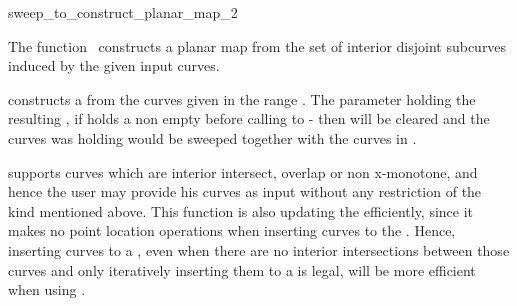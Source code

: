 

\begin{ccRefFunction}{sweep_to_construct_planar_map_2}  %


\ccDefinition
  
The function \ccRefName\ constructs a planar map from the set of 
interior disjoint subcurves induced by the given input curves.



\def\ccLongParamLayout{\ccTrue} 


constructs a  from the curves given in the range
\ccStyle{[curves_begin, curves_end)}. The parameter 
holding the resulting , if  holds a
non empty  before calling to
 - then  will be
cleared and the curves  was holding would be sweeped
together with the curves in \ccStyle{[curves_begin, curves_end)}.

 supports curves which are
interior intersect, overlap or non x-monotone, and hence the user may
provide his curves as input without any restriction of the kind
mentioned above. This function is also updating the 
efficiently, since it makes no point location operations when
inserting curves to the . Hence, inserting curves to a
, even when there are no interior intersections
between those curves and only iteratively inserting them to a
 is legal, will be more efficient when using
.


\end{ccRefFunction}

